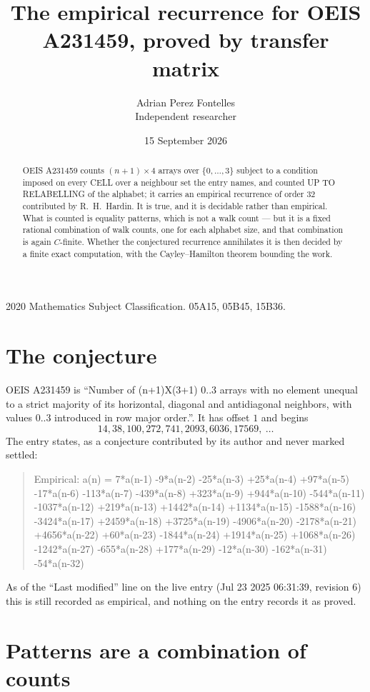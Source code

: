 \documentclass[11pt,a4paper]{article}
\title{The empirical recurrence for OEIS A231459, proved by transfer matrix}
\author{Adrian Perez Fontelles\\ \small Independent researcher}
\date{15 September 2026}
\theoremstyle{plain}
\theoremstyle{definition}
\begin{document}
\maketitle

\begin{abstract}
OEIS A231459 counts $(n+1)\times4$ arrays over $\{0,\dots,3\}$ subject to a condition imposed on
every CELL over a neighbour set the entry names, and counted UP TO RELABELLING of the
alphabet; it carries an empirical recurrence of order $32$ contributed by
R.~H.~Hardin. It is true, and it is decidable rather than empirical. What is counted is
equality patterns, which is not a walk count --- but it is a fixed rational combination of
walk counts, one for each alphabet size, and that combination is again $C$-finite. Whether the
conjectured recurrence annihilates it is then decided by a finite exact computation, with the
Cayley--Hamilton theorem bounding the work.
\end{abstract}

\noindent\small 2020 Mathematics Subject Classification. 05A15, 05B45, 15B36.\normalsize

\section{The conjecture}

OEIS A231459 is ``Number of (n+1)X(3+1) 0..3 arrays with no element unequal to a strict majority of its horizontal, diagonal and antidiagonal neighbors, with values 0..3 introduced in row major order.''. It has offset $1$ and begins
\[
14, 38, 100, 272, 741, 2093, 6036, 17569,\ \dots
\]
The entry states, as a conjecture contributed by its author and never marked settled:
\begin{quote}
Empirical: a(n) = 7*a(n-1) -9*a(n-2) -25*a(n-3) +25*a(n-4) +97*a(n-5) -17*a(n-6) -113*a(n-7) -439*a(n-8) +323*a(n-9) +944*a(n-10) -544*a(n-11) -1037*a(n-12) +219*a(n-13) +1442*a(n-14) +1134*a(n-15) -1588*a(n-16) -3424*a(n-17) +2459*a(n-18) +3725*a(n-19) -4906*a(n-20) -2178*a(n-21) +4656*a(n-22) +60*a(n-23) -1844*a(n-24) +1914*a(n-25) +1068*a(n-26) -1242*a(n-27) -655*a(n-28) +177*a(n-29) -12*a(n-30) -162*a(n-31) -54*a(n-32)
\end{quote}
As of the ``Last modified'' line on the live entry (Jul 23 2025 06:31:39, revision 6) this is still
recorded as empirical, and nothing on the entry records it as proved.

\section{Patterns are a combination of counts}
\end{document}
